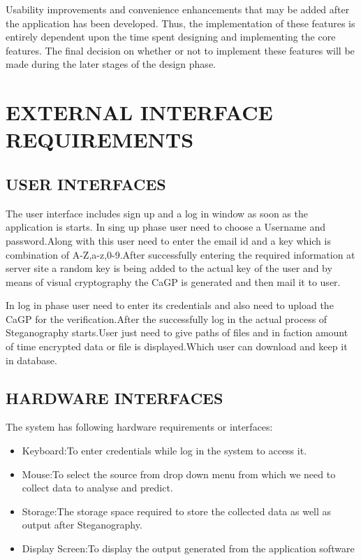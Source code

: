 \documentclass[12pt]{extreport}
\begin{document}
\noindent
Usability improvements and convenience enhancements that may be added after the application has been developed. Thus, the implementation of these features is entirely dependent upon the time spent designing and implementing the core features. The final decision on whether or not to implement these features will be made during the later stages of the design phase.


\section{EXTERNAL INTERFACE REQUIREMENTS}

  \subsection{USER INTERFACES}
\hspace*{5em}The user interface includes sign up and a log in window as soon as the application is starts. In sing up phase user need to choose a Username and password.Along  with this user need to enter the email id and a key which is combination of A-Z,a-z,0-9.After successfully entering the required information at server site a random key is being added to the actual key of the user and by means of visual cryptography the CaGP is generated and then mail it to user.
        \par In log in phase user need to enter its credentials and also need to upload the CaGP for the verification.After the successfully log in the actual process of Steganography starts.User just need to give paths of files and in faction amount of time encrypted data or file is displayed.Which user can download and keep it in database.

 \newpage   
      \subsection{HARDWARE INTERFACES}
The system has following hardware requirements or interfaces:
\begin{itemize}

\item Keyboard:To enter credentials while log in  the system to access it.
\item Mouse:To select the source from drop down menu from which we need to collect data to analyse and predict.
\item Storage:The storage space required to store the collected data as well as output after Steganography.
\item Display Screen:To display the output generated from the application software
\end{itemize}
    
\end{document}
